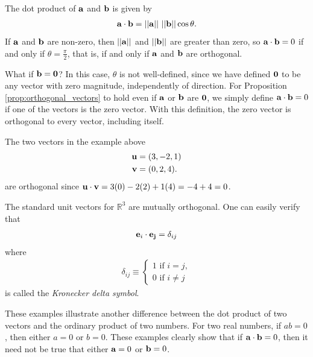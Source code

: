 \documentclass[12pt,letterpaper,reqno]{article}
\numberwithin{equation}{section}
\newcommand{\ti}[1]{\textit{#1}}
\begin{document}
\begin{pf}
	The dot product of ${\bf a}$ and ${\bf b}$ is given by
\begin{align*}
	{\bf a}\cdot {\bf b}=||{\bf a}|| \ ||{\bf b}||\cos \theta.
\end{align*}	
If ${\bf a}$ and ${\bf b}$ are non-zero, then $||{\bf a}||$ and $||{\bf b}||$ are greater than zero, so ${\bf a}\cdot {\bf b}=0$ if and only if $\theta=\frac{\pi}{2}$, that is, if and only if ${\bf a}$ and ${\bf b}$ are orthogonal. 
\end{pf}

What if ${\bf b}={\bf 0}$? In this case, $\theta$ is not well-defined, since we have defined ${\bf 0}$ to be any vector with zero magnitude, independently of direction. For Proposition \ref{prop:orthogonal_vectors} to hold even if ${\bf a}$ or ${\bf b}$ are ${\bf 0}$, we simply define ${\bf a}\cdot {\bf b}=0$ if one of the vectors is the zero vector. With this definition, the zero vector is orthogonal to every vector, including itself.

\begin{example}
The two vectors in the example above	
\begin{align*}
	{\bf u}&=(3,-2,1) \\
	{\bf v}&=(0,2,4).
\end{align*}
are orthogonal since ${\bf u}\cdot {\bf v}=3(0)-2(2)+1(4)=-4+4=0$.
\end{example}

\begin{example}
	The standard unit vectors for $\mathbb{R}^3$ are mutually orthogonal. One can easily verify that 
	\begin{align*}
		{\bf e}_i \cdot {\bf e_j}=\delta_{ij}
	\end{align*}
where 
\begin{align*}
	\delta_{ij} \equiv \begin{cases}
		1 \text{ if } i=j, \\
		0 \text{ if } i \neq j
	\end{cases}
\end{align*}
is called the \ti{Kronecker delta symbol}.
\end{example}

These examples illustrate another difference between the dot product of two vectors and the ordinary product of two numbers. For two real numbers, if $ab=0$, then either $a=0$ or $b=0$. These examples clearly show that if ${\bf a}\cdot {\bf b}=0$, then it need not be true that either ${\bf a}=0$ or ${\bf b}=0$.
\end{document}
